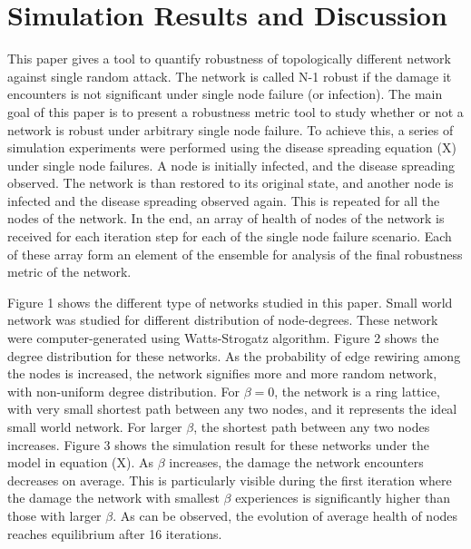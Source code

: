 \documentclass[11pt]{article}
\begin{document}
\section{Simulation Results and Discussion}
This paper gives a tool to quantify robustness of topologically different network against single random attack. The network is called N-1 robust if the damage it encounters is not significant under single node failure (or infection). The main goal of this paper is to present a robustness metric tool to study whether or not a network is robust under arbitrary single node failure. To achieve this, a series of simulation experiments were performed using the disease spreading equation (X) under single node failures. A node is initially infected, and the disease spreading observed. The network is than restored to its original state, and another node is infected and the disease spreading observed again. This is repeated for all the nodes of the network. In the end, an array of health of nodes of the network is received for each iteration step for each of the single node failure scenario. Each of these array form an element of the ensemble for analysis of the final robustness metric of the network. 

Figure 1 shows the different type of networks studied in this paper. Small world network was studied for different distribution of node-degrees. These network were computer-generated using Watts-Strogatz algorithm. Figure 2 shows the degree distribution for these networks. As the probability of edge rewiring among the nodes is increased, the network signifies more and more random network, with non-uniform degree distribution. For $\beta=0$, the network is a ring lattice, with very small shortest path between any two nodes, and it represents the ideal small world network. For larger $\beta$, the shortest path between any two nodes increases. Figure 3 shows the simulation result for these networks under the model in equation (X). As $\beta$ increases, the damage the network encounters decreases on average. This is particularly visible during the first iteration where the damage the network with smallest $\beta$ experiences is significantly higher than those with larger $\beta$. As can be observed, the evolution of average health of nodes reaches equilibrium after 16 iterations. 
\end{document}
